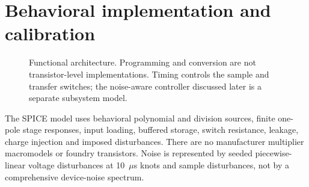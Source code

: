 \documentclass[11pt,a4paper]{article}
\begin{document}
\section{Behavioral implementation and calibration}
\begin{figure}[H]\centering
{}
\caption{Functional architecture. Programming and conversion are not transistor-level implementations. Timing controls the sample and transfer switches; the noise-aware controller discussed later is a separate subsystem model.}
\end{figure}
The SPICE model uses behavioral polynomial and division sources, finite one-pole stage responses, input loading, buffered storage, switch resistance, leakage, charge injection and imposed disturbances. There are no manufacturer multiplier macromodels or foundry transistors. Noise is represented by seeded piecewise-linear voltage disturbances at 10~$\mu$s knots and sample disturbances, not by a comprehensive device-noise spectrum.
\end{document}

